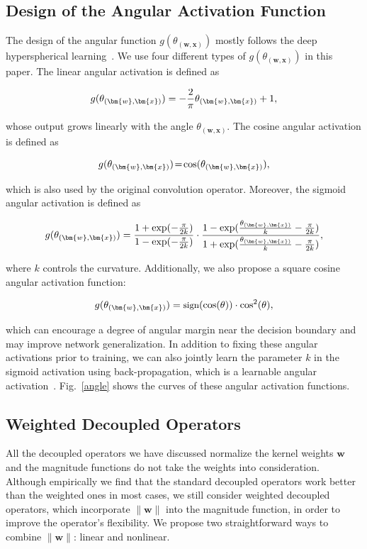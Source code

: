 \subsection{Design of the Angular Activation Function} The design of the angular function $g(\theta_{(\bm{w},\bm{x})})$ mostly follows the deep hyperspherical learning~\cite{liu2017deephyper}. We use four different types of $g(\theta_{(\bm{w},\bm{x})})$ in this paper. The linear angular activation is defined as

\begin{equation}
    \small
    g(\theta_{(\bm{w},\bm{x})})=-\frac{2}{\pi}\theta_{(\bm{w}, \bm{x})}+1,
\end{equation}

whose output grows linearly with the angle $\theta_{(\bm{w}, \bm{x})}$. The cosine angular activation is defined as

\begin{equation}
    \small
\thickmuskip=2mu \medmuskip=2mu g(\theta_{(\bm{w},\bm{x})})=\cos(\theta_{(\bm{w}, \bm{x})}),
\end{equation}

which is also used by the original convolution operator. Moreover, the sigmoid angular activation is defined as

\begin{equation}
    \small
    g(\theta_{(\bm{w},\bm{x})}) =\frac{1+\exp(-\frac{\pi}{2k})}{1-\exp(-\frac{\pi}{2k})} \cdot \frac{1-\exp({\frac{\theta_{(\bm{w},\bm{x})}}{k}-\frac{\pi}{2k}})}{1+\exp({\frac{\theta_{(\bm{w},\bm{x})}}{k}-\frac{\pi}{2k}})},
\end{equation}

where $k$ controls the curvature. Additionally, we also propose a square cosine angular activation function:

\begin{equation}
    \small
    g(\theta_{(\bm{w},\bm{x})})=\textnormal{sign}(\cos(\theta))\cdot\cos^2(\theta),
\end{equation}

which can encourage a degree of angular margin near the decision boundary and may improve network generalization. In addition to fixing these angular activations prior to training, we can also jointly learn the parameter $k$ in the sigmoid activation using back-propagation, which is a learnable angular activation~\cite{liu2017deephyper}. Fig.~\ref{angle} shows the curves of these angular activation functions.

\subsection{Weighted Decoupled Operators} All the decoupled operators we have discussed normalize the kernel weights $\bm{w}$ and the magnitude functions do not take the weights into consideration. Although empirically we find that the standard decoupled operators work better than the weighted ones in most cases, we still consider weighted decoupled operators, which incorporate $\|\bm{w}\|$ into the magnitude function, in order to improve the operator's flexibility. We propose two straightforward ways to combine $\|\bm{w}\|$: linear and nonlinear.
\par

